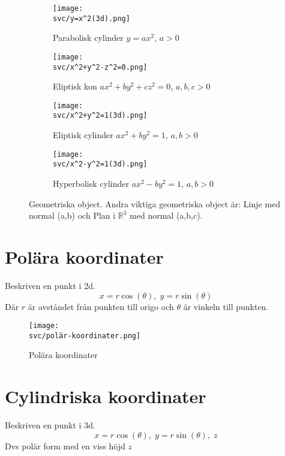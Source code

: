 \begin{figure}[H]
    \begin{subfigure}[b]{0.3\textwidth}
        \centering
        \texttt{[image: \\svc/y=x^2(3d).png]}
        \caption{Parabolisk cylinder $y=ax^2$, $a>0$}
    \end{subfigure}
    \hfill
    \begin{subfigure}[b]{0.3\textwidth}
        \centering
        \texttt{[image: \\svc/x^2+y^2-z^2=0.png]}
        \caption{Eliptisk kon $ax^2+by^2+cz^2=0$, $a,b,c>0$}
    \end{subfigure}
    \hfill
    \begin{subfigure}[b]{0.3\textwidth}
        \centering
        \texttt{[image: \\svc/x^2+y^2=1(3d).png]}
        \caption{Eliptisk cylinder $ax^2+by^2=1$, $a,b>0$}
    \end{subfigure}
    \hfill
    \begin{subfigure}[b]{0.3\textwidth}
        \centering
        \texttt{[image: \\svc/x^2-y^2=1(3d).png]}
        \caption{Hyperbolisk cylinder $ax^2-by^2=1$, $a,b>0$}
    \end{subfigure}
       \caption{Geometriska object. Andra viktiga geometriska object är: Linje med normal (a,b) och Plan i $\mathbb{R}^3$ med normal (a,b,c).}
\end{figure}
\newpage

\section{Polära koordinater}
Beskriven en punkt i 2d.
\begin{equation*}
    x=r\cos(\theta), \; y=r\sin(\theta)
\end{equation*}
Där $r$ är avståndet från punkten till origo och $\theta$ är vinkeln till punkten.

\begin{figure}[H]
    \centering
    \texttt{[image: \\svc/polär-koordinater.png]}
    \caption{Polära koordinater}
\end{figure}


\section{Cylindriska koordinater}
Beskriven en punkt i 3d.
\begin{equation*}
    x=r\cos(\theta), \; y=r\sin(\theta), \; z
\end{equation*}
Dvs polär form med en viss höjd $z$

